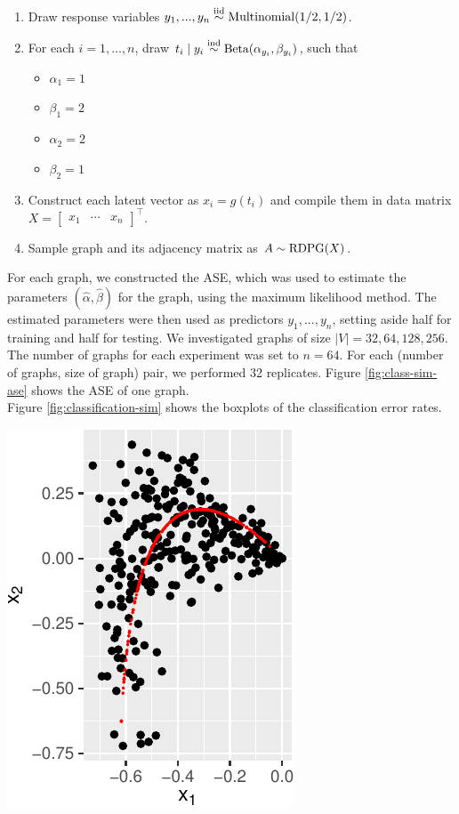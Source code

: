 \documentclass[
  11pt,
]{article}
\providecommand{\tightlist}{%
  \setlength{\itemsep}{0pt}\setlength{\parskip}{0pt}}
\begin{document}
\begin{enumerate}
\def\labelenumi{\arabic{enumi}.}
\tightlist
\item
  Draw response variables \(y_1, ..., y_n \stackrel{\mathrm{iid}}{\sim} \mathrm{Multinomial}(1/2, 1/2)\).
\item
  For each \(i = 1, ..., n\), draw
  \(t_i \mid y_i \stackrel{\mathrm{ind}}{\sim} \mathrm{Beta}(\alpha_{y_i}, \beta_{y_i})\), such
  that

  \begin{itemize}
  \tightlist
  \item
    \(\alpha_1 = 1\)
  \item
    \(\beta_1 = 2\)
  \item
    \(\alpha_2 = 2\)
  \item
    \(\beta_2 = 1\)
  \end{itemize}
\item
  Construct each latent vector as \(x_i = g(t_i)\) and compile them in
  data matrix
  \(X = \begin{bmatrix} x_1 & \cdots & x_n \end{bmatrix}^\top\).
\item
  Sample graph and its adjacency matrix as \(A \sim \mathrm{RDPG}(X)\).
\end{enumerate}

For each graph, we constructed the ASE, which was used to estimate the
parameters \((\hat{\alpha}, \hat{\beta})\) for the graph, using the
maximum likelihood method. The estimated parameters were then used as
predictors \(y_1, ..., y_n\), setting aside half for training and half
for testing. We investigated graphs of size \(|V| = 32, 64, 128, 256\).
The number of graphs for each experiment was set to \(n = 64\). For each
(number of graphs, size of graph) pair, we performed 32 replicates.
Figure \ref{fig:class-sim-ase} shows the ASE of one graph.\\
Figure \ref{fig:classification-sim} shows the boxplots of the
classification error rates.

\begin{center}\includegraphics{draft_files/figure-latex/class-sim-ase-1} \end{center}
\end{document}
